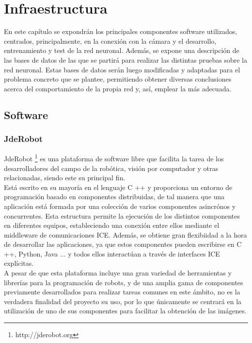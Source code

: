 \chapter{Infraestructura}\label{cap.infraestructura}
En este capítulo se expondrán los principales componentes software utilizados, centrados, principalmente, en la conexión con la cámara y el desarrollo, entrenamiento y test de la red neuronal. Además, se expone una descripción de las bases de datos de las que se partirá para realizar las distintas pruebas sobre la red neuronal. Estas bases de datos serán luego modificadas y adaptadas para el problema concreto que se plantee, permitiendo obtener diversas conclusiones acerca del comportamiento de la propia red y, así, emplear la más adecuada.\\
\section{Software}
\subsection{JdeRobot}
JdeRobot \footnote{http://jderobot.org} es una plataforma de software libre que facilita la tarea de los desarrolladores del campo de la robótica, visión por computador y otras relacionadas, siendo este su principal fin.\\ 

Está escrito en su mayoría en el lenguaje C ++ y proporciona un entorno de programación basado en componentes distribuidas, de tal manera que una aplicación está formada por una colección de varios componentes asincrónos y concurrentes. Esta estructura permite la ejecución de los distintos componentes en diferentes equipos, estableciendo una conexión entre ellos mediante el middleware de comunicaciones ICE. Además, se obtiene gran flexibiidad a la hora de desarrollar las aplicaciones, ya que estos componentes pueden escribirse en C ++, Python, Java ... y todos ellos interactúan a través de interfaces ICE explícitas.\\ 

A pesar de que esta plataforma incluye una gran variedad de herramientas y librerías para la programación de robots, y de una amplia gama de componentes previamente desarrollados para realizar tareas comunes en este ámbito, no es la verdadera finalidad del proyecto su uso, por lo que únicamente se centrará en la utilización de uno de sus componentes para facilitar la obtención de las imágenes.\\


